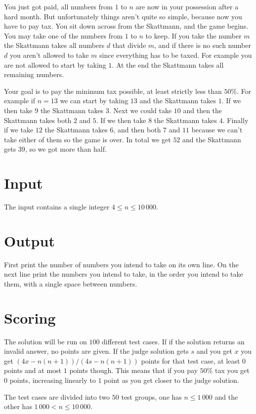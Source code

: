 
You just got paid, all numbers from $1$ to $n$ are now in your possession after
a hard month. But unfortunately things aren't quite so simple, because now you
have to pay tax. You sit down across from the Skattmann, and the game begins. You
may take one of the numbers from $1$ to $n$ to keep. If you take the number $m$
the Skattmann takes all numbers $d$ that divide $m$, and if there is no such number
$d$ you aren't allowed to take $m$ since everything has to be taxed. For example
you are not allowed to start by taking $1$. At the end the Skattmann takes all remaining
numbers.

Your goal is to pay the minimum tax possible, at least strictly less than $50\%$.
For example if $n = 13$ we can start by taking $13$ and the Skattmann takes $1$. If
we then take $9$ the Skattmann takes $3$. Next we could take $10$ and then the Skattmann
takes both $2$ and $5$. If we then take $8$ the Skattmann takes $4$. Finally if we
take $12$ the Skattmann takes $6$, and then both $7$ and $11$ because we can't take
either of them so the game is over. In total we get $52$ and the Skattmann gets $39$,
so we got more than half.

\section*{Input}
The input contains a single integer $4 \leq n \leq 10\,000$.

\section*{Output}
First print the number of numbers you intend to take on its own line. On the next line print
the numbers you intend to take, in the order you intend to take them, with a single space
between numbers.

\section*{Scoring}
The solution will be run on $100$ different test cases. If if the solution returns
an invalid answer, no points are given. If the judge solution gets $s$ and you get $x$
you get $(4x - n(n + 1)) / (4s - n(n + 1))$ points for that test case, at least $0$ points
and at most $1$ points though. This means that if you pay $50\%$ tax you get $0$ points, increasing
linearly to $1$ point as you get closer to the judge solution.

The test cases are divided into two $50$ test groups, one has $n \leq 1\,000$ and the other
has $1\,000 < n \leq 10\,000$.
